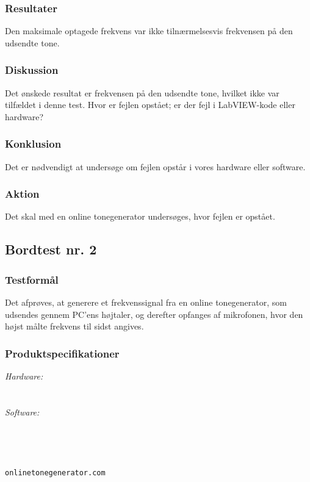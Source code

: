 			\subsubsection{Resultater}
			Den maksimale optagede frekvens var ikke tilnærmelsesvis frekvensen på den udsendte tone.
			\subsubsection{Diskussion}
			Det ønskede resultat er frekvensen på den udsendte tone, hvilket ikke var tilfældet i denne test. Hvor er fejlen opstået; er der fejl i LabVIEW-kode eller hardware? 
			\subsubsection{Konklusion}
			Det er nødvendigt at undersøge om fejlen opstår i vores hardware eller software. 
			\subsubsection{Aktion}
			Det skal med en online tonegenerator undersøges, hvor fejlen er opstået. 

	\subsection{Bordtest nr. 2} %
		\subsubsection{Testformål}
		Det afprøves, at generere et frekvenssignal fra en online tonegenerator, som udsendes gennem PC'ens højtaler, og derefter opfanges af mikrofonen, hvor den højst målte frekvens til sidst angives.  
		
		\subsubsection{Produktspecifikationer}
		
		\textit{Hardware:}\\
		\mikrofon\\
		\PC\\
	
		\textit{Software:}\\
		\labview\\
		\visa\\
		\vi\\
		\ardsw\\
		\texttt{onlinetonegenerator.com}
		
